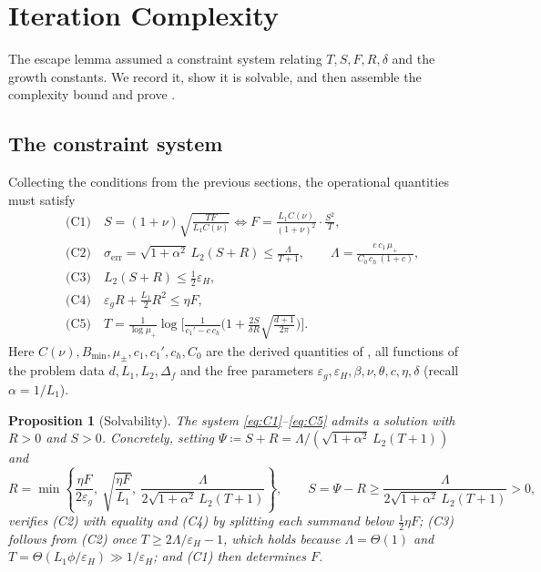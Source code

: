 \documentclass[11pt]{article}
\theoremstyle{plain}
\newtheorem{proposition}{Proposition}[section]
\theoremstyle{definition}
\theoremstyle{remark}
\newcommand{\eps}{\varepsilon}
\newcommand{\epsg}{\eps_{g}}
\newcommand{\epsH}{\eps_{H}}
\newcommand{\Bmin}{B_{\min}}
\newcommand{\mup}{\mu_{+}}
\newcommand{\sg}{\sigma_{\mathrm{err}}}
\begin{document}
\section{Iteration Complexity}
\label{sec:complexity}
 
The escape lemma assumed a constraint system relating
$T,S,F,R,\delta$ and the growth constants. We record it, show it is
solvable, and then assemble the complexity bound and prove
.
 
\subsection{The constraint system}
 
Collecting the conditions from the previous sections, the operational
quantities must satisfy
\begin{align}
  &\text{(C1)}\quad S=(1+\nu)\sqrt{\tfrac{TF}{L_{1}C(\nu)}}
  \iff F=\frac{L_{1}C(\nu)}{(1+\nu)^{2}}\cdot\frac{S^{2}}{T},
  \label{eq:C1}\\
  &\text{(C2)}\quad \sg=\sqrt{1+\alpha^{2}}\,L_{2}(S+R)\le\frac{\Lambda}{T+1},
  \qquad \Lambda=\frac{c\,c_{1}\,\mup}{C_{0}\,c_{h}\,(1+c)},
  \label{eq:C2}\\
  &\text{(C3)}\quad L_{2}(S+R)\le\tfrac12\epsH,
  \label{eq:C3}\\
  &\text{(C4)}\quad \epsg R+\tfrac{L_{1}}{2}R^{2}\le\eta F,
  \label{eq:C4}\\
  &\text{(C5)}\quad T=\frac{1}{\log\mup}
  \log\!\Big[\tfrac{1}{c_{1}'-c\,c_{h}}\big(1+\tfrac{2S}{\delta R}
  \sqrt{\tfrac{d+1}{2\pi}}\big)\Big].
  \label{eq:C5}
\end{align}
Here $C(\nu),\Bmin,\mu_{\pm},c_{1},c_{1}',c_{h},C_{0}$ are the derived
quantities of , all functions of the problem data
$d,L_{1},L_{2},\Delta_{f}$ and the free parameters
$\epsg,\epsH,\beta,\nu,\theta,c,\eta,\delta$ (recall $\alpha=1/L_{1}$).
 
\begin{proposition}[Solvability]
\label{prop:solvable}
The system \eqref{eq:C1}--\eqref{eq:C5} admits a solution with
$R>0$ and $S>0$. Concretely, setting
$\Psi\coloneqq S+R=\Lambda/(\sqrt{1+\alpha^{2}}\,L_{2}(T+1))$
and
\[
  R=\min\!\left\{\frac{\eta F}{2\epsg},\ \sqrt{\frac{\eta F}{L_{1}}},\
  \frac{\Lambda}{2\sqrt{1+\alpha^{2}}\,L_{2}(T+1)}\right\},
  \qquad S=\Psi-R\ge\frac{\Lambda}{2\sqrt{1+\alpha^{2}}\,L_{2}(T+1)}>0,
\]
verifies (C2) with equality and (C4) by splitting each summand below
$\tfrac12\eta F$; (C3) follows from (C2) once $T\ge2\Lambda/\epsH-1$,
which holds because $\Lambda=\Theta(1)$ and $T=\Theta(L_{1}\phi/\epsH)\gg1/\epsH$;
and (C1) then determines $F$.
\end{proposition}
 
\end{document}
